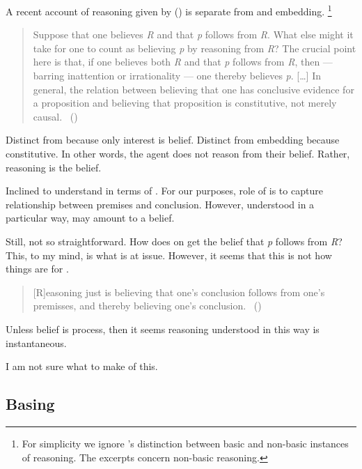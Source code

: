 \begin{note}
  A recent account of reasoning given by \cite{Valaris:2014un} (\citeyear{Valaris:2014un}) is separate from \wit{} and embedding.%
  \footnote{
    For simplicity we ignore \citeauthor{Valaris:2014un}'s distinction between basic and non-basic instances of reasoning.
    The excerpts concern non-basic reasoning.
  }

    \begin{quote}
    Suppose that one believes \emph{R} and that \emph{p} follows from \emph{R}.
    What else might it take for one to count as believing \emph{p} by reasoning from \emph{R}?
    The crucial point here is that, if one believes both \emph{R} and that \emph{p} follows from \emph{R}, then --- barring inattention or irrationality --- one thereby believes \emph{p}.
    [\dots]
    In general, the relation between believing that one has conclusive evidence for a proposition and believing that proposition is constitutive, not merely causal.%
    \mbox{ }\hfill\mbox{(\citeyear[110 ]{Valaris:2014un})}
  \end{quote}

  Distinct from \wit{} because only interest is belief.
  Distinct from embedding because constitutive.
  In other words, the agent does not reason from their belief.
  Rather, reasoning is the belief.

  Inclined to understand in terms of \ros{}.
  For our purposes, role of \ros{} is to capture relationship between premises and conclusion.
  However, understood in a particular way, may amount to a belief.

  Still, not so straightforward.
  How does on get the belief that \emph{p} follows from \emph{R}?
  This, to my mind, is what is at issue.
  However, it seems that this is not how things are for \citeauthor{Valaris:2014un}.

  \begin{quote}
    [R]easoning just is believing that one's conclusion follows from one's premisses, and thereby believing one's conclusion.%
    \mbox{ }\hfill\mbox{(\citeyear[112]{Valaris:2014un})}
  \end{quote}

  Unless belief is process, then it seems reasoning understood in this way is instantaneous.

  I am not sure what to make of this.
\end{note}

\subsection*{Basing}
\label{sec:basing}

